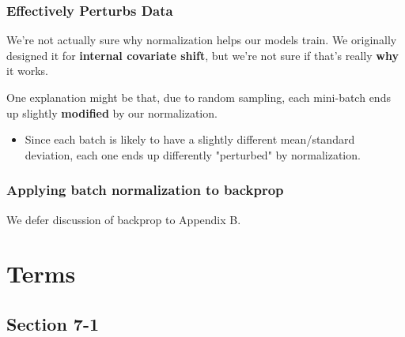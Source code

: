         \subsubsection{Effectively Perturbs Data}

            We're not actually sure why normalization helps our models train. We originally designed it for \textbf{internal covariate shift}, but we're not sure if that's really \textbf{why} it works.

            One explanation might be that, due to random sampling, each mini-batch ends up slightly \textbf{modified} by our normalization.
            
            \begin{itemize}
                \item Since each batch is likely to have a slightly different mean/standard deviation, each one ends up differently "perturbed" by normalization.
            \end{itemize}

        \subsubsection{Applying batch normalization to backprop}

            We defer discussion of backprop to Appendix B.

    \pagebreak


\pagebreak
\section{Terms}
    \subsection*{Section 7-1}


